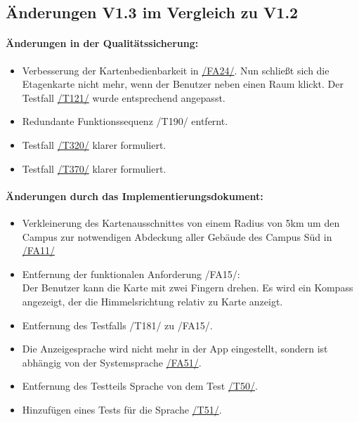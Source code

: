 \subsection*{Änderungen V1.3 im Vergleich zu V1.2}
\paragraph*{Änderungen in der Qualitätssicherung:}
\begin{itemize}
    \item Verbesserung der Kartenbedienbarkeit in \hyperref[/FA24/]{/FA24/}. Nun schließt sich die Etagenkarte nicht mehr, wenn der Benutzer neben einen Raum klickt. Der Testfall \hyperref[/T121/]{/T121/} wurde entsprechend angepasst.
    \item Redundante Funktionssequenz /T190/ entfernt.
    \item Testfall \hyperref[/T320/]{/T320/} klarer formuliert.
    \item Testfall \hyperref[/T370/]{/T370/} klarer formuliert.
\end{itemize}

\paragraph*{Änderungen durch das Implementierungsdokument:}
\begin{itemize}
    \item Verkleinerung des Kartenausschnittes von einem Radius von 5km um den \Gls{Campus} zur notwendigen Abdeckung aller Gebäude des \Gls{Campus} Süd in \hyperref[/FA11/]{/FA11/}
    \item Entfernung der funktionalen Anforderung /FA15/: \\ Der \Gls{Benutzer} kann die \Gls{Karte} mit zwei Fingern drehen. Es wird ein Kompass angezeigt, der die Himmelsrichtung relativ zu \Gls{Karte} anzeigt.
    \item Entfernung des Testfalls /T181/ zu /FA15/.
    \item Die Anzeigesprache wird nicht mehr in der App eingestellt, sondern ist abhängig von der Systemsprache \hyperref[/FA51/]{/FA51/}.
    \item Entfernung des Testteils Sprache von dem Test \hyperref[/T50/]{/T50/}.
    \item Hinzufügen eines Tests für die Sprache \hyperref[/T51/]{/T51/}.
\end{itemize}